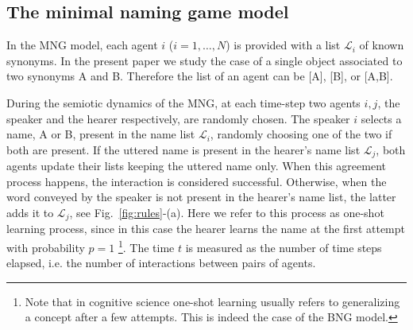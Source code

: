 \documentclass[review]{elsarticle}
\newcommand{\+}{\! + \!}
\renewcommand{\L}{{\mathcal{L}}}
\begin{document}

\subsection{The minimal naming game model} 
\label{sec:NG}


In the MNG model, each agent $i$ ($i=1,\dots,N$) is provided with a list $\L_i$ of known synonyms.
In the present paper we study the case of a single object associated to two synonyms A and B.
Therefore the list of an agent can be [A], [B], or [A,B].


During the semiotic dynamics of the MNG,  at each time-step two agents $i, j$, the speaker and the hearer respectively, are randomly chosen. 
The speaker $i$ selects a name, A or B, present in the name list  $\L_i$, randomly choosing one of the two if both are present.
If the uttered name is present in the hearer's name list  $\L_j$, both agents update their lists keeping the uttered name  only. 
When this agreement process happens, the interaction is considered successful. 
Otherwise, when the word conveyed by the speaker is not present in the hearer's name list, the latter adds it to $\L_j$, see Fig.~\ref{fig:rules}-(a).
Here we refer to this process as one-shot learning process, since in this case the hearer learns the name at the first attempt with probability $p=1$ \footnote{Note that in cognitive science one-shot learning usually refers to generalizing a concept after a few attempts. This is indeed the case of the BNG model.}. 
The time $t$ is measured as the number of time steps elapsed, i.e. the number of interactions between pairs of agents.
 
 
\end{document}
